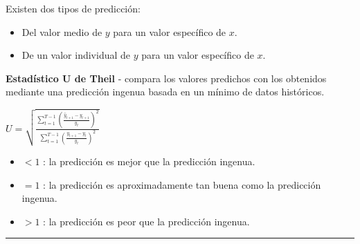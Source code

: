 \begin{f}[Predicción]
	
	Existen dos tipos de predicción:
	
	\begin{itemize}[leftmargin=*]
		\item Del valor medio de \(y\) para un valor específico de \(x\).
		\item De un valor individual de \(y\) para un valor específico de \(x\).
	\end{itemize}
	
	\textbf{Estadístico U de Theil} - compara los valores predichos con los obtenidos mediante una predicción ingenua basada en un mínimo de datos históricos.
	
	\begin{center}
		\(U = \sqrt{\frac{\sum_{t=1}^{T-1} \left( \frac{\hat{y}_{t+1} - y_{t+1}}{y_t} \right)^2}{\sum_{t=1}^{T-1} \left( \frac{y_{t+1} - y_t}{y_t} \right)^2}}\)
	\end{center}
	
	\begin{itemize}[leftmargin=*]
		\item \(<1\) : la predicción es mejor que la predicción ingenua.
		\item \(=1\) : la predicción es aproximadamente tan buena como la predicción ingenua.
		\item \(>1\) : la predicción es peor que la predicción ingenua.
	\end{itemize}
	
\end{f}  \hrule

